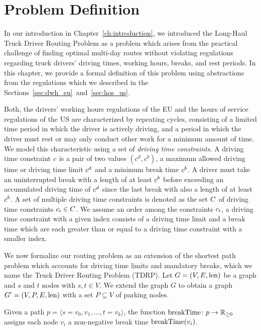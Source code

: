 \chapter{Problem Definition}\label{ch:problem_definitions}
In our introduction in Chapter~\ref{ch:introduction}, we introduced the Long-Haul Truck Driver Routing Problem as a problem which arises from the practical challenge of finding optimal multi-day routes without violating regulations regarding truck drivers' driving times, working hours, breaks, and rest periods. In this chapter, we provide a formal definition of this problem using abstractions from the regulations which we described in the Sections~\ref{sec:dwh_eu}~and~\ref{sec:hos_us}.

Both, the drivers' working hours regulations of the EU and the hours of service regulations of the US are characterized by repeating cycles, consisting of a limited time period in which the driver is actively driving, and a period in which the driver must rest or may only conduct other work for a minimum amount of time. We model this characteristic using a set of \emph{driving time constraints}. A driving time constraint $c$ is a pair of two values $(c^d,c^b)$, a maximum allowed driving time or driving time limit $c^d$ and a minimum break time $c^b$. A driver must take an uninterrupted break with a length of at least $c^b$ before exceeding an accumulated driving time of $c^d$ since the last break with also a length of at least $c^b$. A set of multiple driving time constraints is denoted as the set $C$ of driving time constraints $c_i \in C$. We assume an order among the constraints $c_i$, a driving time constraint with a given index consists of a driving time limit and a break time which are each greater than or equal to a driving time constraint with a smaller index.

We now formalize our routing problem as an extension of the shortest path problem which accounts for driving time limits and mandatory breaks, which we name the Truck Driver Routing Problem (TDRP). Let $G=(V,E,\operatorname{len})$ be a graph and $s$ and $t$ nodes with $s,t \in V$. We extend the graph $G$ to obtain a graph $G'=(V,P,E,\operatorname{len})$ with a set $P \subseteq V$ of parking nodes.

\begin{definition}
	Given a path $p = \langle s=v_0,v_1,...,t=v_k \rangle$, the function $\operatorname{breakTime}\colon p \rightarrow \mathbb{R}_{\ge 0}$ assigns each node $v_i$ a non-negative break time $\operatorname{breakTime}(v_i)$.
\end{definition}

